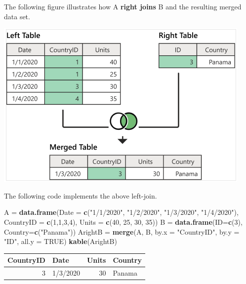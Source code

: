 \documentclass[
]{book}
\newenvironment{Shaded}{\begin{snugshade}}{\end{snugshade}}
\newcommand{\AttributeTok}[1]{\textcolor[rgb]{0.13,0.29,0.53}{#1}}
\newcommand{\ConstantTok}[1]{\textcolor[rgb]{0.56,0.35,0.01}{#1}}
\newcommand{\DecValTok}[1]{\textcolor[rgb]{0.00,0.00,0.81}{#1}}
\newcommand{\FunctionTok}[1]{\textcolor[rgb]{0.13,0.29,0.53}{\textbf{#1}}}
\newcommand{\NormalTok}[1]{#1}
\newcommand{\OtherTok}[1]{\textcolor[rgb]{0.56,0.35,0.01}{#1}}
\newcommand{\StringTok}[1]{\textcolor[rgb]{0.31,0.60,0.02}{#1}}
\begin{document}
The following figure illustrates how A \textbf{right joins} B and the resulting merged data set.

\begin{center}\includegraphics[width=0.7\linewidth]{img05/w5-rightJoin} \end{center}

The following code implements the above left-join.

\begin{Shaded}
\begin{Highlighting}[]
\NormalTok{A }\OtherTok{=} \FunctionTok{data.frame}\NormalTok{(}\AttributeTok{Date =} \FunctionTok{c}\NormalTok{(}\StringTok{"1/1/2020"}\NormalTok{, }\StringTok{"1/2/2020"}\NormalTok{, }\StringTok{"1/3/2020"}\NormalTok{, }\StringTok{"1/4/2020"}\NormalTok{),}
               \AttributeTok{CountryID =} \FunctionTok{c}\NormalTok{(}\DecValTok{1}\NormalTok{,}\DecValTok{1}\NormalTok{,}\DecValTok{3}\NormalTok{,}\DecValTok{4}\NormalTok{),}
               \AttributeTok{Units =} \FunctionTok{c}\NormalTok{(}\DecValTok{40}\NormalTok{, }\DecValTok{25}\NormalTok{, }\DecValTok{30}\NormalTok{, }\DecValTok{35}\NormalTok{))}
\NormalTok{B }\OtherTok{=} \FunctionTok{data.frame}\NormalTok{(}\AttributeTok{ID=}\FunctionTok{c}\NormalTok{(}\DecValTok{3}\NormalTok{),}
               \AttributeTok{Country=}\FunctionTok{c}\NormalTok{(}\StringTok{"Panama"}\NormalTok{))}
\NormalTok{ArightB }\OtherTok{=} \FunctionTok{merge}\NormalTok{(A, B, }\AttributeTok{by.x =} \StringTok{"CountryID"}\NormalTok{, }\AttributeTok{by.y =} \StringTok{"ID"}\NormalTok{, }\AttributeTok{all.y =} \ConstantTok{TRUE}\NormalTok{)}
\FunctionTok{kable}\NormalTok{(ArightB)}
\end{Highlighting}
\end{Shaded}

\begin{tabular}{r|l|r|l}
\hline
CountryID & Date & Units & Country\\
\hline
3 & 1/3/2020 & 30 & Panama\\
\hline
\end{tabular}
\end{document}

